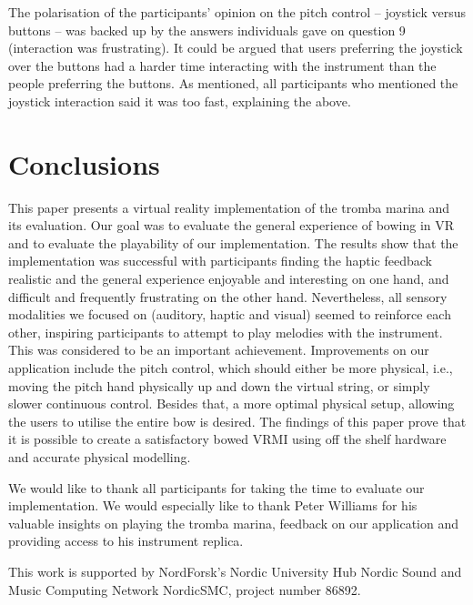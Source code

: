 \documentclass[dvipsnames, pdftex]{article}
\begin{document}
The polarisation of the participants' opinion on the pitch control -- joystick versus buttons -- was backed up by the answers individuals gave on question 9 (interaction was frustrating). It could be argued that users preferring the joystick over the buttons had a harder time interacting with the instrument than the people preferring the buttons. As mentioned, all participants who mentioned the joystick interaction said it was too fast, explaining the above.

\section{Conclusions} \label{sec:conclusion}
This paper presents a virtual reality implementation of the tromba marina and its evaluation. Our goal was to evaluate the general experience of bowing in VR and to evaluate the playability of our implementation. The results show that the implementation was successful with participants finding the haptic feedback realistic and the general experience enjoyable and interesting on one hand, and difficult and frequently frustrating on the other hand. Nevertheless, all sensory modalities we focused on (auditory, haptic and visual) seemed to reinforce each other, inspiring participants to attempt to play melodies with the instrument. This was considered to be an important achievement.
Improvements on our application include the pitch control, which  should either be more physical, i.e., moving the pitch hand physically up and down the virtual string, or simply slower continuous control. Besides that, a more optimal physical setup, allowing the users to utilise the entire bow is desired.
The findings of this paper prove that it is possible to create a satisfactory bowed VRMI using off the shelf hardware and accurate physical modelling. 

\begin{acknowledgments}
We would like to thank all participants for taking the time to evaluate our implementation. We would especially like to thank Peter Williams for his valuable insights on playing the tromba marina, feedback on our application and providing access to his instrument replica. 

This work is supported by NordForsk's Nordic
University Hub Nordic Sound and Music Computing Network
NordicSMC, project number 86892.
\end{acknowledgments} 

{
\small

}
\end{document}
